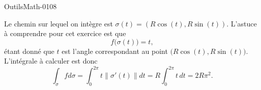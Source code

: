 
\begin{corrige}{OutilsMath-0108}

    Le chemin sur lequel on intègre est $\sigma(t)=(R\cos(t),R\sin(t))$. L'astuce à comprendre pour cet exercice est que
    \begin{equation}
        f\big( \sigma(t) \big)=t,
    \end{equation}
    étant donné que $t$ est l'angle correspondant au point $\big( R\cos(t),R\sin(t) \big)$. L'intégrale à calculer est donc
    \begin{equation}
        \int_{\sigma}fd\sigma=\int_0^{2\pi}t\| \sigma'(t) \|dt=R\int_0^{2\pi}t\,dt=2R\pi^2.
    \end{equation}

\end{corrige}
